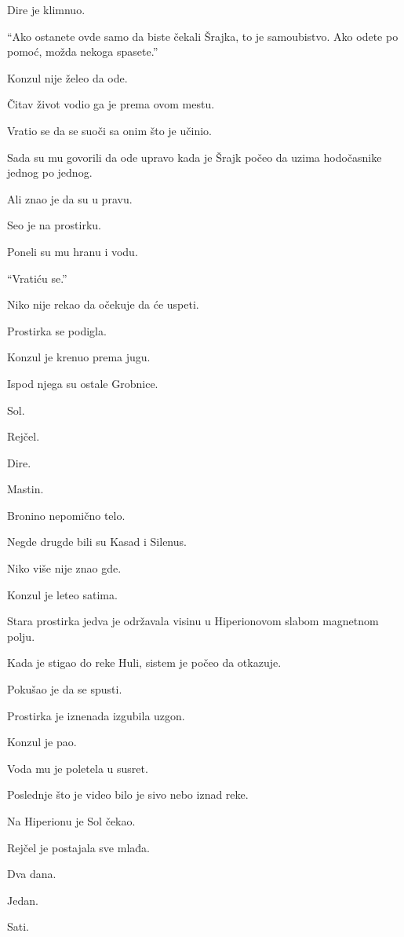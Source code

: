 Dire je klimnuo.

``Ako ostanete ovde samo da biste čekali Šrajka, to je samoubistvo. Ako odete po pomoć, možda nekoga spasete.''

Konzul nije želeo da ode.

Čitav život vodio ga je prema ovom mestu.

Vratio se da se suoči sa onim što je učinio.

Sada su mu govorili da ode upravo kada je Šrajk počeo da uzima hodočasnike jednog po jednog.

Ali znao je da su u pravu.

Seo je na prostirku.

Poneli su mu hranu i vodu.

``Vratiću se.''

Niko nije rekao da očekuje da će uspeti.

\bigskip

Prostirka se podigla.

Konzul je krenuo prema jugu.

Ispod njega su ostale Grobnice.

Sol.

Rejčel.

Dire.

Mastin.

Bronino nepomično telo.

Negde drugde bili su Kasad i Silenus.

Niko više nije znao gde.

\bigskip

Konzul je leteo satima.

Stara prostirka jedva je održavala visinu u Hiperionovom slabom magnetnom polju.

Kada je stigao do reke Huli, sistem je počeo da otkazuje.

Pokušao je da se spusti.

Prostirka je iznenada izgubila uzgon.

Konzul je pao.

Voda mu je poletela u susret.

Poslednje što je video bilo je sivo nebo iznad reke.

\bigskip

Na Hiperionu je Sol čekao.

Rejčel je postajala sve mlađa.

Dva dana.

Jedan.

Sati.


